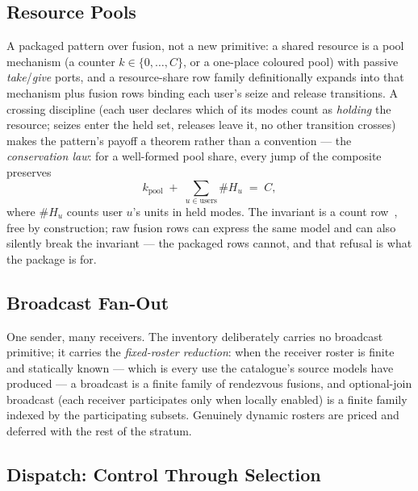 \subsection{Resource Pools}

A packaged pattern over fusion, not a new primitive: a shared
resource is a pool mechanism (a counter $k \in \{0,\dots,C\}$, or a
one-place coloured pool) with passive \emph{take}/\emph{give} ports,
and a resource-share row family definitionally expands into that
mechanism plus fusion rows binding each user's seize and release
transitions. A crossing discipline (each user declares which of its
modes count as \emph{holding} the resource; seizes enter the held
set, releases leave it, no other transition crosses) makes the
pattern's payoff a theorem rather than a convention --- the
\emph{conservation law}: for a well-formed pool share, every jump of
the composite preserves
\[
  k_{\mathrm{pool}} \;+\; \sum_{u \in \mathrm{users}} \#H_u \;=\; C,
\]
where $\#H_u$ counts user $u$'s units in held modes. The invariant is
a count row~\cite{master25}, free by construction; raw fusion rows can express the
same model and can also silently break the invariant --- the packaged
rows cannot, and that refusal is what the package is for.

\subsection{Broadcast Fan-Out}

One sender, many receivers. The inventory deliberately carries no
broadcast primitive; it carries the \emph{fixed-roster reduction}:
when the receiver roster is finite and statically known --- which is
every use the catalogue's source models have produced --- a broadcast
is a finite family of rendezvous fusions, and optional-join broadcast
(each receiver participates only when locally enabled) is a finite
family indexed by the participating subsets. Genuinely dynamic
rosters are priced and deferred with the rest of the stratum.

\subsection{Dispatch: Control Through Selection}

